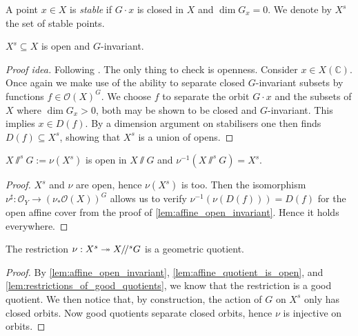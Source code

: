 \documentclass[12pt]{ociamthesis}  %
\begin{document}
\begin{definition}\label{def:affine_stability}
  A point $x\in X$ is \emph{stable} if $G\cdot x$ is closed in $X$
  and $\dim G_x = 0$. We denote by $X^s$ the set of stable
  points.
\end{definition}

\begin{lemma}\label{lem:affine_open_invariant}
  $X^s \subseteq X$ is open and $G$-invariant.
  \begin{proof}[Proof idea]
    Following \cite[Proposition 4.36]{hoskins2016}.
    The only thing to check is openness.
    Consider $x\in X(\mathbb C)$.  Once again we make use of the
    ability to separate closed $G$-invariant subsets by functions
    $f \in \mathscr O(X)^G$. \cite[Lemma 4.29]{hoskins2016}
    We choose $f$ to separate the orbit $G\cdot x$ and the
    subsets of $X$ where $\dim G_x > 0$, both may be shown to
    be closed and $G$-invariant. This implies $x\in D(f)$.
    By a dimension argument on stabilisers one then finds
    $D(f)\subseteq X^s$, showing that $X^s$ is a union of opens.
  \end{proof}
\end{lemma}

\begin{lemma}\label{lem:affine_quotient_is_open}
  $X\sslash^s G := \nu(X^s)$ is open in $X\sslash G$ and
  $\nu^{-1}(X\sslash^s G) = X^s$.
  \begin{proof}
    $X^s$ and $\nu$ are open, hence $\nu(X^s)$ is too.
    Then the isomorphism $\nu^\sharp : \mathscr O_Y \to (\nu_*\mathscr O(X))^G$
    allows us to verify $\nu^{-1}(\nu(D(f))) = D(f)$ for the open
    affine cover from the proof of \ref{lem:affine_open_invariant}.
    Hence it holds everywhere.
  \end{proof}
\end{lemma}

\begin{theorem}\label{thm:affine_quotient_is_geometric}
  The restriction $\nu : X^s \twoheadrightarrow X/\!/^s G$ is a geometric quotient.
  \begin{proof}
    By \ref{lem:affine_open_invariant}, \ref{lem:affine_quotient_is_open},
    and \ref{lem:restrictions_of_good_quotients}, we know that
    the restriction is a good quotient. We then notice that, by construction,
    the action of $G$ on $X^s$ only has closed orbits. Now good
    quotients separate closed orbits, hence $\nu$ is injective on orbits.
  \end{proof}
\end{theorem}
\end{document}
